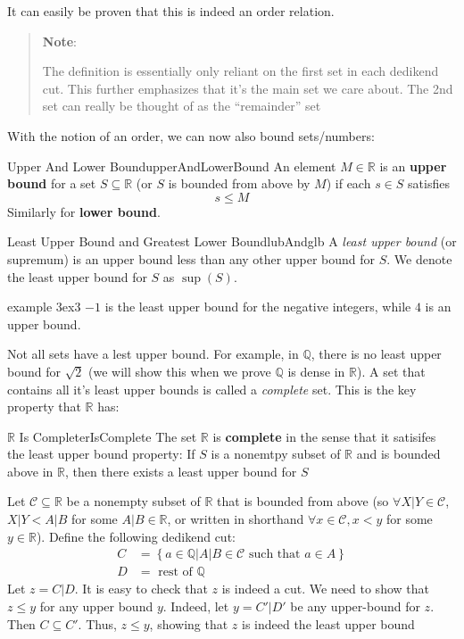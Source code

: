 \documentclass{book}
\newcommand{\Q}{{\mathbb{Q}}}
\newcommand{\R}{{\mathbb{R}}}
\newcommand{\CC}{{\mathcal{C}}}
\newcommand{\sse}{\subseteq}
\renewcommand{\mid}{\big|}
\renewcommand{\bf}[1]{\textbf{#1}}
\newenvironment{note}
 {\begin{tcolorbox}[enhanced, sharp corners, colback=white , borderline={0.2pt}{0pt}{black}]
   \begin{quote}\textbf{Note}:
   }{
   \end{quote}\end{tcolorbox}}
\newenvironment{Proof}[1][]
  {\begin{ProofTcb}[#1]}
  {\end{ProofTcb}}
\begin{document}
It can easily be proven that this is indeed an order relation.
\begin{note}
	The definition is essentially only reliant on the first set in each dedikend cut. This further emphasizes that it's
	the main set we care about. The 2nd set can really be thought of as the ``remainder'' set
\end{note}

With the notion of an order, we can now also bound sets/numbers:

\begin{defn}{Upper And Lower Bound}{upperAndLowerBound}
	An element $M \in \R$ is an \bf{upper bound} for a set $S \sse \R$ (or $S$ is bounded from above by $M$) if each $s \in S$ satisfies
	\[
		s \le M
	\]
	Similarly for \bf{lower bound}.
\end{defn}

\begin{defn}{Least Upper Bound and Greatest Lower Bound}{lubAndglb}
	A \emph{least upper bound} (or supremum) is an upper bound less than any other upper bound for $S$. We denote the least upper
	bound for $S$ as $\sup(S)$.
\end{defn}

\begin{example}{example 3}{ex3}
	$-1$ is the least upper bound for the negative integers, while $4$ is an upper bound.
\end{example}

Not all sets have a lest upper bound. For example, in $\Q$, there is no least upper bound for $\sqrt{2}$ (we will show
this when we prove $\Q$ is dense in $\R$). A set that contains all it's least upper bounds is called a \emph{complete}
set. This is the key property that $\R$ has:

\begin{thm}{$\R$ Is Complete}{rIsComplete}
	The set $\R$ is \bf{complete} in the sense that it satisifes the least upper bound property: If $S$ is a nonemtpy
	subset of $\R$ and is bounded above in $\R$, then there exists a least upper bound for $S$
\end{thm}

\begin{Proof}
	Let $\CC \sse \R$ be a nonempty subset of $\R$ that is bounded from above (so $\forall X|Y \in \CC$, $X|Y < A|B$ for some
	$A|B \in \R$, or written in shorthand $\forall x \in \CC, x < y$ for some $y \in \R$). Define the following dedikend
	cut:
	\begin{align*}
		C &= \left\{ a \in \Q \mid A|B \in \CC \text{ such that } a \in A \right\}\\
		D &= \text{ rest of $\Q$}
	\end{align*}
	Let $z = C|D$. It is easy to check that $z$ is indeed a cut. We need to show that $z \le y$ for any upper bound $y$.
	Indeed, let $y = C'|D'$ be any upper-bound for $z$. Then $C \sse C'$. Thus, $z \le y$, showing that $z$ is indeed
	the least upper bound
\end{Proof}
\end{document}
